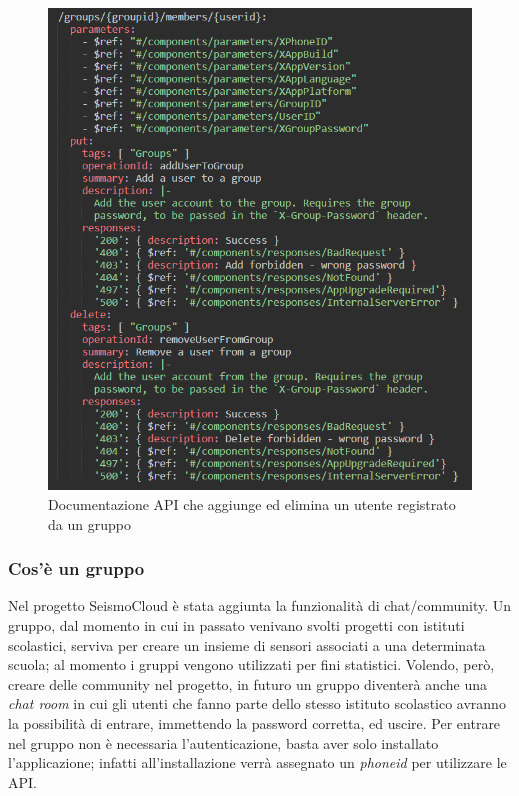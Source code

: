 \documentclass[main.tex]{subfiles}
\begin{document}
\begin{figure}[H]
    \centering
    \includegraphics[width=1\linewidth]{img/redesign-api-task/redesign-api-swagger-user-old.PNG}
    \caption{Documentazione API che aggiunge ed elimina un utente registrato da un gruppo}
    \label{fig:redesign-api-swagger-user-old}
\end{figure}
\subsubsection{Cos'è un gruppo}\label{sec: gruppo}
Nel progetto SeismoCloud è stata aggiunta la funzionalità di chat/community. Un gruppo, dal momento in cui in passato venivano svolti progetti con istituti scolastici, serviva per creare un insieme di sensori associati a una determinata scuola; al momento i gruppi vengono utilizzati per fini statistici. Volendo, però, creare delle community nel progetto, in futuro un gruppo diventerà anche una \emph{chat room} in cui gli utenti che fanno parte dello stesso istituto scolastico avranno la possibilità di entrare, immettendo la password corretta, ed uscire. Per entrare nel gruppo non è necessaria l'autenticazione, basta aver solo installato l'applicazione; infatti all'installazione verrà assegnato un \emph{phoneid} per utilizzare le API.\newline
\end{document}
